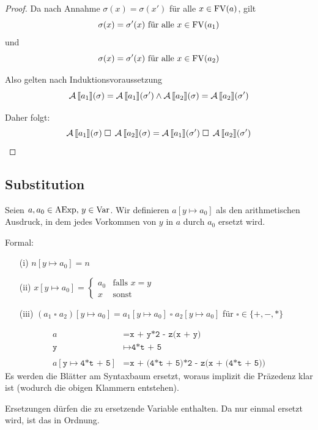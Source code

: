 \begin{proof}
    Da nach Annahme $\sigma(x) = \sigma(x')$ für alle $x \in \operatorname{FV}(a)$, gilt
    \[
    \sigma(x) = \sigma'(x) \text{ für alle } x \in \operatorname{FV}(a_1)
    \]
    und
    \[
    \sigma(x) = \sigma'(x) \text{ für alle } x \in \operatorname{FV}(a_2)
    \]

    Also gelten nach Induktionsvoraussetzung
    \[
    \operatorname{\mathcal{A}}\mathrm{[}\kern-.14em\mathrm{[} a_1 \mathrm{]}\kern-.14em\mathrm{]}(\sigma) = \operatorname{\mathcal{A}}\mathrm{[}\kern-.14em\mathrm{[} a_1 \mathrm{]}\kern-.14em\mathrm{]}(\sigma') \wedge \operatorname{\mathcal{A}}\mathrm{[}\kern-.14em\mathrm{[} a_2 \mathrm{]}\kern-.14em\mathrm{]}(\sigma) = \operatorname{\mathcal{A}}\mathrm{[}\kern-.14em\mathrm{[} a_2 \mathrm{]}\kern-.14em\mathrm{]}(\sigma')
    \]

    Daher folgt:
    \[
    \operatorname{\mathcal{A}}\mathrm{[}\kern-.14em\mathrm{[} a_1 \mathrm{]}\kern-.14em\mathrm{]}(\sigma) \;\square\; \operatorname{\mathcal{A}}\mathrm{[}\kern-.14em\mathrm{[} a_2 \mathrm{]}\kern-.14em\mathrm{]}(\sigma) = \operatorname{\mathcal{A}}\mathrm{[}\kern-.14em\mathrm{[} a_1 \mathrm{]}\kern-.14em\mathrm{]}(\sigma') \;\square\; \operatorname{\mathcal{A}}\mathrm{[}\kern-.14em\mathrm{[} a_2 \mathrm{]}\kern-.14em\mathrm{]}(\sigma')
    \]
\end{proof}



\subsection{Substitution}\label{section:substitution}

\begin{definition} \label{def:substitutionExp}
    Seien $a, a_0 \in \operatorname{AExp}, \, y \in \operatorname{Var}$. Wir definieren $a[y \mapsto a_0]$ als den arithmetischen Ausdruck, in dem jedes Vorkommen von $y$ in $a$ durch $a_0$ ersetzt wird.

    Formal:
    \begin{enumerate}
        \item[(i)] $n[y \mapsto a_0] = n$
        \item[(ii)] $x[y \mapsto a_0] = \begin{cases} a_0 & \text{falls } x = y \\ x & \text{sonst} \end{cases}$
        \item[(iii)] $(a_1 \;\square\; a_2)[y \mapsto a_0] = a_1[y \mapsto a_0] \;\square\; a_2[y \mapsto a_0]$ \quad\quad für $\square \in \{ +, -, * \}$
    \end{enumerate}
\end{definition}

\begin{example}
    \begin{align*}
        a & = \texttt{x + y*2 - z(x + y)} \\
        \texttt{y} & \mapsto \texttt{4*t + 5} \\
        \\
        a[\texttt{y} \mapsto \texttt{4*t + 5}] & = \texttt{x + (4*t + 5)*2 - z(x + (4*t + 5))}
    \end{align*}
    Es werden die Blätter am Syntaxbaum ersetzt, woraus implizit die Präzedenz klar ist (wodurch die obigen Klammern entstehen).

    Ersetzungen dürfen die zu ersetzende Variable enthalten. Da nur einmal ersetzt wird, ist das in Ordnung.
\end{example}

